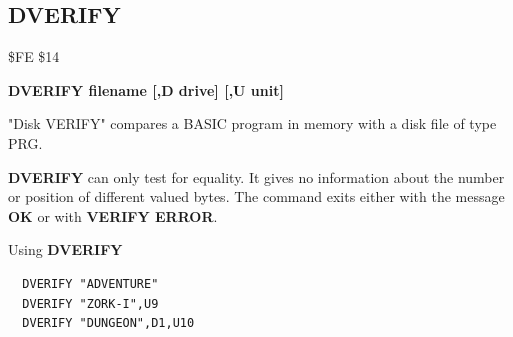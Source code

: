 
\newpage
\subsection{DVERIFY}
\begin{description}[leftmargin=2cm,style=nextline]
\item [Token:] \$FE \$14
\item [Format:] {\bf DVERIFY filename [,D drive] [,U unit] }
\item [Usage:]
   "Disk VERIFY" compares a BASIC program
   in memory with a disk file of type PRG.

   \filenamedefinition

   \drivedefinition

   \unitdefinition

\item [Remarks:]
   {\bf DVERIFY} can only test for equality. It gives no information
   about the number or position of different valued bytes.
   The command exits either with the message {\bf OK}
   or with {\bf VERIFY ERROR}.

\item [Example:] Using {\bf DVERIFY}
\begin{tcolorbox}[colback=black,coltext=white]
\verbatimfont{\codefont}
\begin{verbatim}
  DVERIFY "ADVENTURE"
  DVERIFY "ZORK-I",U9
  DVERIFY "DUNGEON",D1,U10
\end{verbatim}
\end{tcolorbox}
\end{description}


\newpage
